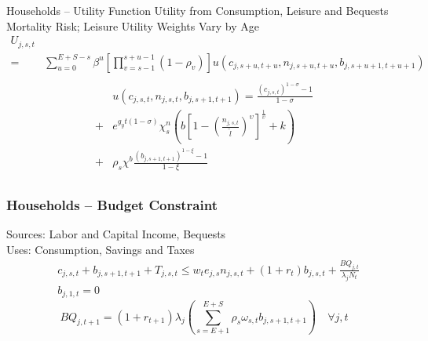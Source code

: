 \documentclass{beamer}
\begin{document}
  \begin{frame}{Households -- Utility Function}\label{Utility Function}
    Utility from Consumption, Leisure and Bequests \\
    Mortality Risk;  Leisure Utility Weights Vary by Age
    \begin{equation}
      \begin{split}
        U_{j,s,t} \\
        = & \sum_{u=0}^{E+S-s}\beta^u\left[\prod_{v=s-1}^{s+u-1}(1-\rho_v)\right] u\left(c_{j,s+u,t+u},n_{j,s+u,t+u},b_{j,s+u+1,t+u+1}\right) \nonumber \\
      \end{split}
    \end{equation}
    \begin{equation}
      \begin{split}
        & u\left(c_{j,s,t},n_{j,s,t},b_{j,s+1,t+1}\right) = \frac{\left(c_{j,s,t}\right)^{1-\sigma} - 1}{1-\sigma} \\
        + & e^{g_y t(1-\sigma)}\chi^n_s\left(b\left[1 - \left(\frac{n_{j,s,t}}{\tilde{l}}\right)^\upsilon\right]^\frac{1}{\upsilon} + k\right) \\
        + & \rho_s\chi^b\frac{\left(b_{j,s+1,t+1}\right)^{1-\xi} - 1}{1-\xi} \nonumber \\
      \end{split}
    \end{equation}
    \hyperlink{elliptic}{}
  \end{frame}

  \begin{frame}
    \frametitle{Households -- Budget Constraint}
    Sources: Labor and Capital Income, Bequests \\
    Uses: Consumption, Savings and Taxes
    \begin{equation}
      \begin{split}
        & c_{j,s,t} + b_{j,s+1,t+1} + T_{j,s,t} \leq  w_t e_{j,s}n_{j,s,t} + \left(1 + r_t\right) b_{j,s,t} + \frac{BQ_{j,t}}{\lambda_jN_t}  \\
        & b_{j,1,t} = 0  \nonumber 
      \end{split}
    \end{equation}
    \begin{equation}
      BQ_{j,t+1} = (1+r_{t+1})\lambda_j\left(\sum_{s=E+1}^{E+S}\rho_s\omega_{s,t}b_{j,s+1,t+1}\right) \quad\forall j,t \nonumber
    \end{equation}
  \end{frame}
\end{document}
